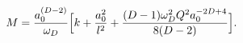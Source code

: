 \begin{equation}
M = {a_0^{(D -2)}\over \omega_D} \Big[k + {a_0^2\over l^2}
+ {(D-1) \omega_D^2 Q^2 a_0^{-2 D +4} \over{8(D-2)}}\Big].
\label{mroot}
\end{equation}

